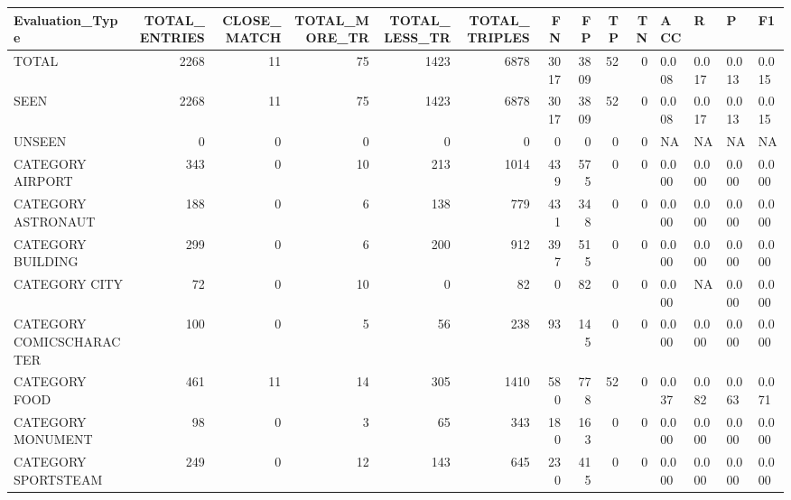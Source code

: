 \begin{tabular}{lrrrrrrrrrllll}
\hline
 Evaluation\_Type          &   TOTAL\_ENTRIES &   CLOSE\_MATCH &   TOTAL\_MORE\_TR &   TOTAL\_LESS\_TR &   TOTAL\_TRIPLES &   FN &   FP &   TP &   TN & ACC   & R     & P     & F1    \\
\hline
 TOTAL                    &            2268 &            11 &              75 &            1423 &            6878 & 3017 & 3809 &   52 &    0 & 0.008 & 0.017 & 0.013 & 0.015 \\
 SEEN                     &            2268 &            11 &              75 &            1423 &            6878 & 3017 & 3809 &   52 &    0 & 0.008 & 0.017 & 0.013 & 0.015 \\
 UNSEEN                   &               0 &             0 &               0 &               0 &               0 &    0 &    0 &    0 &    0 & NA    & NA    & NA    & NA    \\
 CATEGORY AIRPORT         &             343 &             0 &              10 &             213 &            1014 &  439 &  575 &    0 &    0 & 0.000 & 0.000 & 0.000 & 0.000 \\
 CATEGORY ASTRONAUT       &             188 &             0 &               6 &             138 &             779 &  431 &  348 &    0 &    0 & 0.000 & 0.000 & 0.000 & 0.000 \\
 CATEGORY BUILDING        &             299 &             0 &               6 &             200 &             912 &  397 &  515 &    0 &    0 & 0.000 & 0.000 & 0.000 & 0.000 \\
 CATEGORY CITY            &              72 &             0 &              10 &               0 &              82 &    0 &   82 &    0 &    0 & 0.000 & NA    & 0.000 & 0.000 \\
 CATEGORY COMICSCHARACTER &             100 &             0 &               5 &              56 &             238 &   93 &  145 &    0 &    0 & 0.000 & 0.000 & 0.000 & 0.000 \\
 CATEGORY FOOD            &             461 &            11 &              14 &             305 &            1410 &  580 &  778 &   52 &    0 & 0.037 & 0.082 & 0.063 & 0.071 \\
 CATEGORY MONUMENT        &              98 &             0 &               3 &              65 &             343 &  180 &  163 &    0 &    0 & 0.000 & 0.000 & 0.000 & 0.000 \\
 CATEGORY SPORTSTEAM      &             249 &             0 &              12 &             143 &             645 &  230 &  415 &    0 &    0 & 0.000 & 0.000 & 0.000 & 0.000 \\

\end{tabular}
